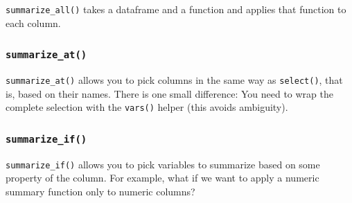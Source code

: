 \documentclass[
]{book}
\newenvironment{Shaded}{\begin{snugshade}}{\end{snugshade}}
\newcommand{\CommentTok}[1]{\textcolor[rgb]{0.56,0.35,0.01}{\textit{#1}}}
\newcommand{\DataTypeTok}[1]{\textcolor[rgb]{0.13,0.29,0.53}{#1}}
\newcommand{\KeywordTok}[1]{\textcolor[rgb]{0.13,0.29,0.53}{\textbf{#1}}}
\newcommand{\NormalTok}[1]{#1}
\newcommand{\OperatorTok}[1]{\textcolor[rgb]{0.81,0.36,0.00}{\textbf{#1}}}
\newcommand{\StringTok}[1]{\textcolor[rgb]{0.31,0.60,0.02}{#1}}
\begin{document}
\texttt{summarize\_all()} takes a dataframe and a function and applies that function to each column.

\begin{Shaded}
\end{Shaded}

\hypertarget{summarize_at}{%
\subsubsection*{\texorpdfstring{\texttt{summarize\_at()}}{summarize\_at()}}\label{summarize_at}}

\texttt{summarize\_at()} allows you to pick columns in the same way as \texttt{select()}, that is, based on their names. There is one small difference: You need to wrap the complete selection with the \texttt{vars()} helper (this avoids ambiguity).

\begin{Shaded}
\end{Shaded}

\hypertarget{summarize_if}{%
\subsubsection*{\texorpdfstring{\texttt{summarize\_if()}}{summarize\_if()}}\label{summarize_if}}

\texttt{summarize\_if()} allows you to pick variables to summarize based on some property of the column. For example, what if we want to apply a numeric summary function only to numeric columns?

\begin{Shaded}
\end{Shaded}
\end{document}
